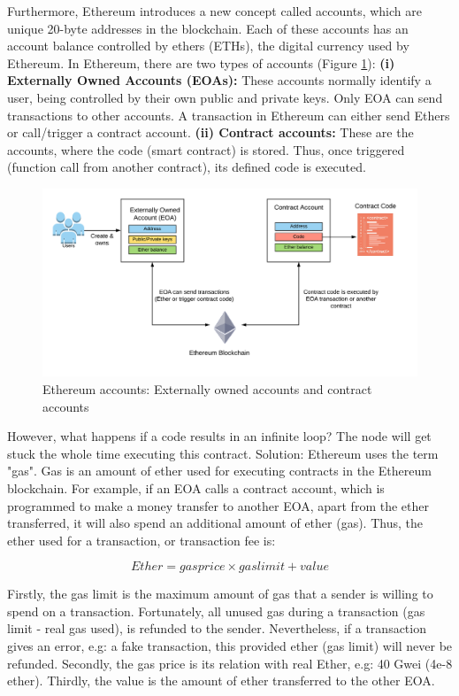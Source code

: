 Furthermore, Ethereum introduces a new concept called accounts, which are unique 20-byte addresses in the blockchain. Each of these accounts has an account balance controlled by ethers (ETHs), the digital currency used by Ethereum. In Ethereum, there are two types of accounts (Figure \ref{fig:EthereumAccounts}): \newline
\textbf{(i) Externally Owned Accounts (EOAs):} These accounts normally identify a user, being controlled by their own public and private keys. Only EOA can send transactions to other accounts. A transaction in Ethereum can either send Ethers or call/trigger a contract account. \newline
\textbf{(ii) Contract accounts:} These are the accounts, where the code (smart contract) is stored. Thus, once triggered (function call from another contract), its defined code is executed.

\begin{figure}
  \centering
  	\includegraphics[scale=0.7]{gfx/ethereumAccounts.png}
  \caption{Ethereum accounts: Externally owned accounts and contract accounts}
  \label{fig:EthereumAccounts}
\end{figure}

However, what happens if a code results in an infinite loop? The node will get stuck the whole time executing this contract. Solution: Ethereum uses the term "gas". Gas is an amount of ether used for executing contracts in the Ethereum blockchain. For example, if an EOA calls a contract account, which is programmed to make a money transfer to another EOA, apart from the ether transferred, it will also spend an additional amount of ether (gas). Thus, the ether used for a transaction, or transaction fee is:

$$Ether = gas price \times gas limit + value$$

Firstly, the gas limit is the maximum amount of gas that a sender is willing to spend on a transaction. Fortunately, all unused gas during a transaction (gas limit - real gas used), is refunded to the sender. Nevertheless, if a transaction gives an error, e.g: a fake transaction, this provided ether (gas limit) will never be refunded. Secondly, the gas price is its relation with real Ether, e.g: 40 Gwei (4e-8 ether). Thirdly, the value is the amount of ether transferred to the other EOA.

